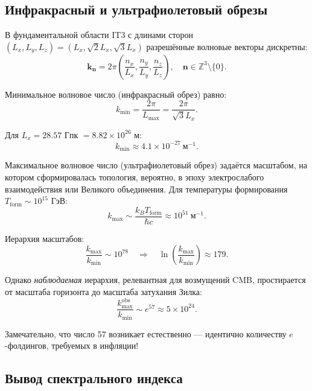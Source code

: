\documentclass[12pt,a4paper]{article}
\begin{document}
\subsection{Инфракрасный и ультрафиолетовый обрезы}

В фундаментальной области IT3 с длинами сторон $(L_x, L_y, L_z) = (L_x, \sqrt{2}L_x, \sqrt{3}L_x)$ разрешённые волновые векторы дискретны:
\begin{equation}
\mathbf{k}_{\mathbf{n}} = 2\pi \left(\frac{n_x}{L_x}, \frac{n_y}{L_y}, \frac{n_z}{L_z}\right), \quad \mathbf{n} \in \mathbb{Z}^3 \setminus \{0\}.
\end{equation}

Минимальное волновое число (инфракрасный обрез) равно:
\begin{equation}
k_{\mathrm{min}} = \frac{2\pi}{L_{\mathrm{max}}} = \frac{2\pi}{\sqrt{3} L_x}.
\end{equation}

Для $L_x = 28.57$ Гпк $= 8.82 \times 10^{26}$ м:
\begin{equation}
k_{\mathrm{min}} \approx 4.1 \times 10^{-27}~\mathrm{м}^{-1}.
\end{equation}

Максимальное волновое число (ультрафиолетовый обрез) задаётся масштабом, на котором сформировалась топология, вероятно, в эпоху электрослабого взаимодействия или Великого объединения. Для температуры формирования $T_{\mathrm{form}} \sim 10^{15}$ ГэВ:
\begin{equation}
k_{\max} \sim \frac{k_B T_{\mathrm{form}}}{\hbar c} \approx 10^{51}~\mathrm{м}^{-1}.
\end{equation}

Иерархия масштабов:
\begin{equation}
\frac{k_{\max}}{k_{\min}} \sim 10^{78} \quad \Rightarrow \quad \ln\left(\frac{k_{\max}}{k_{\min}}\right) \approx 179.
\end{equation}

Однако \textit{наблюдаемая} иерархия, релевантная для возмущений CMB, простирается от масштаба горизонта до масштаба затухания Зилка:
\begin{equation}
\frac{k_{\max}^{\mathrm{obs}}}{k_{\min}} \sim e^{57} \approx 5 \times 10^{24}.
\end{equation}

Замечательно, что число 57 возникает естественно — идентично количеству $e$-фолдингов, требуемых в инфляции!

\subsection{Вывод спектрального индекса}
\end{document}
